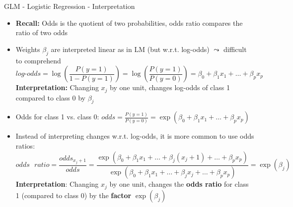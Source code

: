 \documentclass[11pt,compress,t,notes=noshow, aspectratio=169, xcolor=table]{beamer}
\begin{document}
\begin{frame}[c]{GLM - Logistic Regression - Interpretation}

    \begin{itemize}
        \item \textbf{Recall:} Odds is the quotient of two probabilities, odds ratio compares the ratio of two odds 
        \item Weights $\beta_j$ are interpreted linear as in LM (but w.r.t. log-odds) $\leadsto$ difficult to comprehend
        $$log\text{-}odds = \log \left(\frac{P(y = 1)}{1 - P(y=1)}\right) = \log \left(\frac{P(y = 1)}{P(y=0)}\right) = \beta_0 + \beta_1 x_1 + \ldots + \beta_p x_p  $$
        \textbf{Interpretation:} Changing $x_j$ by one unit, changes log-odds of class 1 compared to class 0 by $\beta_j$%
        \pause
        \item Odds for class 1 vs. class 0: %
        $odds = \displaystyle\frac{P(y = 1)}{P(y=0)}= \exp(\beta_0 + \beta_1 x_1 + \ldots + \beta_p x_p)$
        \item Instead of interpreting changes w.r.t. log-odds, it is more common to use odds ratios:
        $$odds\text{ }ratio = \frac{odds_{x_j+1}}{odds} = \frac{\exp(\beta_0 + \beta_1 x_1 + \ldots + \beta_j (x_j+1) + \ldots + \beta_p x_p)}{\exp(\beta_0 + \beta_1 x_1 + \ldots + \beta_j x_j + \ldots + \beta_p x_p)} = \exp{(\beta_j)} $$
        \textbf{Interpretation}: Changing $x_j$ by one unit, changes the \textbf{odds ratio} for class 1 (compared to class 0) by the \textbf{factor} $\exp(\beta_j)$
    \end{itemize}	

\end{frame}
\end{document}
